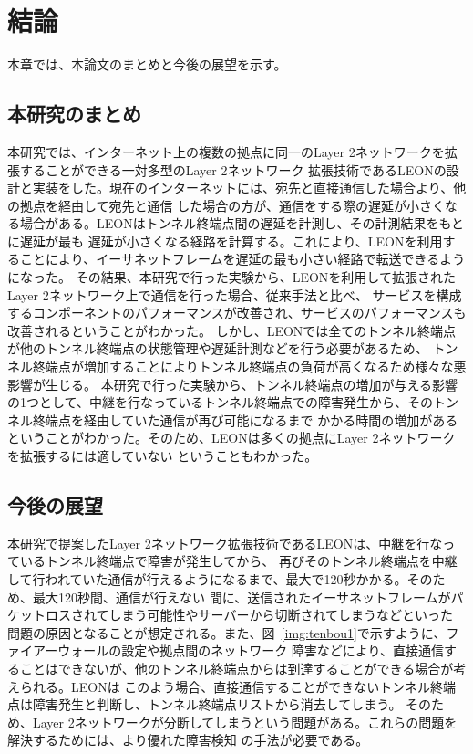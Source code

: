 \chapter{結論}
\label{conclusion}

本章では、本論文のまとめと今後の展望を示す。

\section{本研究のまとめ}

本研究では、インターネット上の複数の拠点に同一のLayer 2ネットワークを拡張することができる一対多型のLayer 2ネットワーク
拡張技術であるLEONの設計と実装をした。現在のインターネットには、宛先と直接通信した場合より、他の拠点を経由して宛先と通信
した場合の方が、通信をする際の遅延が小さくなる場合がある。LEONはトンネル終端点間の遅延を計測し、その計測結果をもとに遅延が最も
遅延が小さくなる経路を計算する。これにより、LEONを利用することにより、イーサネットフレームを遅延の最も小さい経路で転送できるようになった。
その結果、本研究で行った実験から、LEONを利用して拡張されたLayer 2ネットワーク上で通信を行った場合、従来手法と比べ、
サービスを構成するコンポーネントのパフォーマンスが改善され、サービスのパフォーマンスも改善されるということがわかった。
しかし、LEONでは全てのトンネル終端点が他のトンネル終端点の状態管理や遅延計測などを行う必要があるため、
トンネル終端点が増加することによりトンネル終端点の負荷が高くなるため様々な悪影響が生じる。
本研究で行った実験から、トンネル終端点の増加が与える影響の1つとして、中継を行なっているトンネル終端点での障害発生から、そのトンネル終端点を経由していた通信が再び可能になるまで
かかる時間の増加があるということがわかった。そのため、LEONは多くの拠点にLayer 2ネットワークを拡張するには適していない
ということもわかった。

\section{今後の展望}

本研究で提案したLayer 2ネットワーク拡張技術であるLEONは、中継を行なっているトンネル終端点で障害が発生してから、
再びそのトンネル終端点を中継して行われていた通信が行えるようになるまで、最大で120秒かかる。そのため、最大120秒間、通信が行えない
間に、送信されたイーサネットフレームがパケットロスされてしまう可能性やサーバーから切断されてしまうなどといった
問題の原因となることが想定される。また、図~\ref{img:tenbou1}で示すように、ファイアーウォールの設定や拠点間のネットワーク
障害などにより、直接通信することはできないが、他のトンネル終端点からは到達することができる場合が考えられる。LEONは
このよう場合、直接通信することができないトンネル終端点は障害発生と判断し、トンネル終端点リストから消去してしまう。
そのため、Layer 2ネットワークが分断してしまうという問題がある。これらの問題を解決するためには、より優れた障害検知
の手法が必要である。

